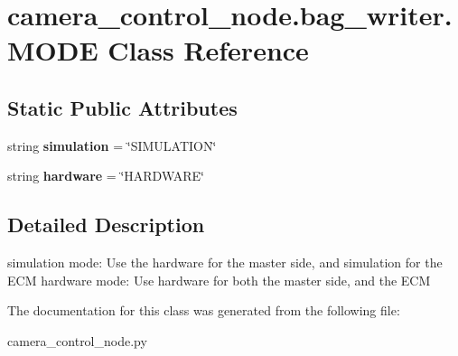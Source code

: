 \hypertarget{classcamera__control__node_1_1bag__writer_1_1MODE}{\section{camera\-\_\-control\-\_\-node.\-bag\-\_\-writer.\-M\-O\-D\-E Class Reference}
\label{classcamera__control__node_1_1bag__writer_1_1MODE}
}
\subsection*{Static Public Attributes}
\begin{DoxyCompactItemize}
\item 
\hypertarget{classcamera__control__node_1_1bag__writer_1_1MODE_a33b9d486cc874a445d0e4755db6ac578}{string {\bfseries simulation} = \char`\"{}S\-I\-M\-U\-L\-A\-T\-I\-O\-N\char`\"{}}\label{classcamera__control__node_1_1bag__writer_1_1MODE_a33b9d486cc874a445d0e4755db6ac578}

\item 
\hypertarget{classcamera__control__node_1_1bag__writer_1_1MODE_ae5ff304a71194295f7d4c7eee5a3cbee}{string {\bfseries hardware} = \char`\"{}H\-A\-R\-D\-W\-A\-R\-E\char`\"{}}\label{classcamera__control__node_1_1bag__writer_1_1MODE_ae5ff304a71194295f7d4c7eee5a3cbee}

\end{DoxyCompactItemize}


\subsection{Detailed Description}
\begin{DoxyVerb}    simulation mode: Use the hardware for the master side, 
            and simulation for the ECM
    hardware mode: Use hardware for both the master side,
            and the ECM
\end{DoxyVerb}
 

The documentation for this class was generated from the following file\-:\begin{DoxyCompactItemize}
\item 
camera\-\_\-control\-\_\-node.\-py\end{DoxyCompactItemize}
